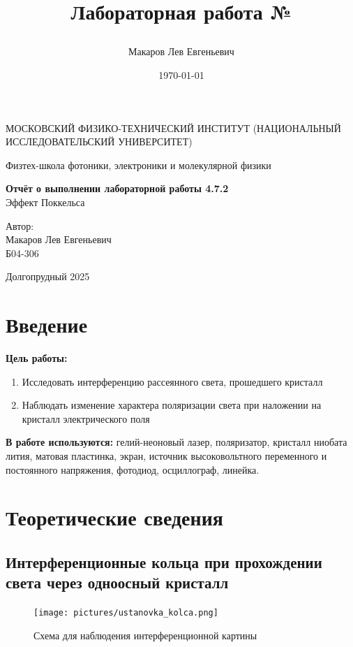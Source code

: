 \documentclass[a4paper,12pt]{article}
\author{Макаров Лев Евгеньевич}
\title{Лабораторная работа №\labnumber

\labname
}
\date{\today}
\newcommand\labname{Эффект Поккельса}
\newcommand\labnumber{4.7.2}
\begin{document}
\begin{titlepage}
	\begin{center}
		{\large МОСКОВСКИЙ ФИЗИКО-ТЕХНИЧЕСКИЙ ИНСТИТУТ (НАЦИОНАЛЬНЫЙ ИССЛЕДОВАТЕЛЬСКИЙ УНИВЕРСИТЕТ)}
	\end{center}
	\begin{center}
		{\large Физтех-школа фотоники, электроники и молекулярной физики}
	\end{center}
	
	
	\vspace{4.5cm}
	{\huge
		\begin{center}
			{\bf Отчёт о выполнении лабораторной работы \labnumber}\\
			\labname
		\end{center}
	}
	\vspace{2cm}
	\begin{flushright}
		{\LARGE Автор:\\ Макаров Лев Евгеньевич \\
			\vspace{0.2cm}
			Б04-306}
	\end{flushright}
	\vspace{8cm}
	\begin{center}
		Долгопрудный 2025
	\end{center}
\end{titlepage}


\section{Введение}
\textbf{Цель работы:} 
\begin{enumerate}
	\item Исследовать интерференцию рассеянного света, прошедшего кристалл
    \item Наблюдать изменение характера поляризации света при наложении на кристалл электрического поля
\end{enumerate}

\textbf{В работе используются:} гелий-неоновый лазер, поляризатор, кристалл ниобата лития, матовая пластинка, экран, источник высоковольтного переменного и постоянного напряжения, фотодиод, осциллограф, линейка.


\section{Теоретические сведения}
\subsection{Интерференционные кольца при прохождении света через одноосный кристалл}
\begin{figure}[h]
    \center\texttt{[image: pictures/ustanovka\_kolca.png]}
    \caption{Схема для наблюдения интерференционной картины}\label{fig:ustanovka_kolca}
\end{figure}
\end{document}

